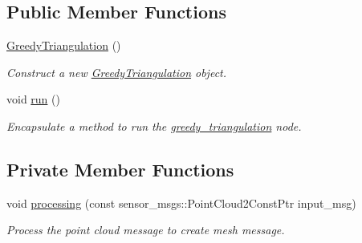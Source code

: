 \subsection*{Public Member Functions}
\begin{DoxyCompactItemize}
\item 
\hyperlink{classgreedy__triangulation_1_1_greedy_triangulation_aa72aa5549f91496308e74182524c20ba}{Greedy\+Triangulation} ()
\begin{DoxyCompactList}\small\item\em Construct a new \hyperlink{classgreedy__triangulation_1_1_greedy_triangulation}{Greedy\+Triangulation} object. \end{DoxyCompactList}\item 
void \hyperlink{classgreedy__triangulation_1_1_greedy_triangulation_ac8a14592c912234b10fec99bc11b6fe9}{run} ()
\begin{DoxyCompactList}\small\item\em Encapsulate a method to run the \hyperlink{namespacegreedy__triangulation}{greedy\+\_\+triangulation} node. \end{DoxyCompactList}\end{DoxyCompactItemize}
\subsection*{Private Member Functions}
\begin{DoxyCompactItemize}
\item 
void \hyperlink{classgreedy__triangulation_1_1_greedy_triangulation_a202974e4b7bfda702b2abde1894e2526}{processing} (const sensor\+\_\+msgs\+::\+Point\+Cloud2\+Const\+Ptr input\+\_\+msg)
\begin{DoxyCompactList}\small\item\em Process the point cloud message to create mesh message. \end{DoxyCompactList}\end{DoxyCompactItemize}
